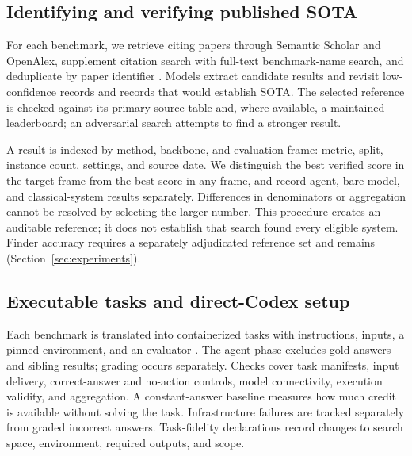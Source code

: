 \subsection{Identifying and verifying published SOTA}
\label{sec:method:opponent}

For each benchmark, we retrieve citing papers through Semantic Scholar and OpenAlex, supplement
citation search with full-text benchmark-name search, and deduplicate by paper identifier
\citep{kinney2023semantic,priem2022openalex}. Models extract candidate results and revisit
low-confidence records and records that would establish SOTA. The selected reference is checked
against its primary-source table and, where available, a maintained leaderboard; an adversarial
search attempts to find a stronger result.

A result is indexed by method, backbone, and evaluation frame: metric, split, instance count,
settings, and source date. We distinguish the best verified score in the target frame from the
best score in any frame, and record agent, bare-model, and classical-system results separately.
Differences in denominators or aggregation cannot be resolved by selecting the larger number.
This procedure creates an auditable reference; it does not establish that search found every
eligible system. Finder accuracy requires a separately adjudicated reference set and remains
 (Section~\ref{sec:experiments}).

\subsection{Executable tasks and direct-Codex setup}
\label{sec:method:executable}
\label{sec:setup}

Each benchmark is translated into containerized tasks with instructions, inputs, a pinned
environment, and an evaluator \citep{harbor2026}. The agent phase excludes
gold answers and sibling results; grading occurs separately. Checks cover task manifests, input
delivery, correct-answer and no-action controls, model connectivity, execution validity, and
aggregation. A constant-answer baseline measures how much credit is available without solving
the task. Infrastructure failures are tracked separately from graded incorrect answers.
Task-fidelity declarations record changes to search space, environment, required outputs, and
scope.

